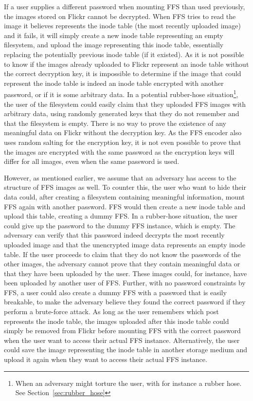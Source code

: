 If a user supplies a different password when mounting \gls{FFS} than used previously, the images stored on Flickr cannot be decrypted. When \gls{FFS} tries to read the image it believes represents the inode table (the most recently uploaded image) and it fails, it will simply create a new inode table representing an empty filesystem, and upload the image representing this inode table, essentially replacing the potentially previous inode table (if it existed). As it is not possible to know if the images already uploaded to Flickr represent an inode table without the correct decryption key, it is impossible to determine if the image that could represent the inode table is indeed an inode table encrypted with another password, or if it is some arbitrary data. In a potential \mbox{rubber-hose} situation\footnote{When an adversary might torture the user, with for instance a rubber hose. See Section~\ref{sec:rubber_hose}}, the user of the filesystem could easily claim that they uploaded \gls{FFS} images with arbitrary data, using randomly generated keys that they do not remember and that the filesystem is empty. There is no way to prove the existence of any meaningful data on Flickr without the decryption key. As the \gls{FFS} encoder also uses random salting for the encryption key, it is not even possible to prove that the images are encrypted with the same password as the encryption keys will differ for all images, even when the same password is used. 

However, as mentioned earlier, we assume that an adversary has access to the structure of \gls{FFS} images as well. To counter this, the user who want to hide their data could, after creating a filesystem containing meaningful information, mount \gls{FFS} again with another password. \gls{FFS} would then create a new inode table and upload this table, creating a dummy \gls{FFS}. In a \mbox{rubber-hose} situation, the user could give up the password to the dummy \gls{FFS} instance, which is empty. The adversary can verify that this password indeed decrypts the most recently uploaded image and that the unencrypted image data represents an empty inode table. If the user proceeds to claim that they do not know the passwords of the other images, the adversary cannot prove that they contain meaningful data or that they have been uploaded by the user. These images could, for instance, have been uploaded by another user of \gls{FFS}. Further, with no password constraints by \gls{FFS}, a user could also create a dummy \gls{FFS} with a password that is easily breakable, to make the adversary believe they found the correct password if they perform a \mbox{brute-force} attack. As long as the user remembers which post represents the inode table, the images uploaded after this inode table could simply be removed from Flickr before mounting \gls{FFS} with the correct password when the user want to access their actual \gls{FFS} instance. Alternatively, the user could save the image representing the inode table in another storage medium and upload it again when they want to access their actual \gls{FFS} instance.

